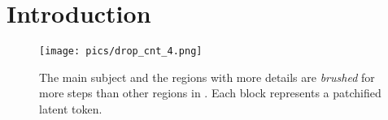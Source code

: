 \section{Introduction}
\label{sec:intro}

\begin{figure}
    \centering
        \texttt{[image: pics/drop\_cnt\_4.png]}
        \caption{The main subject and the regions with more details are \textit{brushed} for more steps than other regions in \ourmethod{}. Each block represents a patchified latent token.}
        \label{fig:drop_cnt_map}
\end{figure}

    

